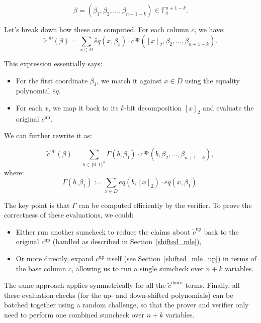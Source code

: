 \documentclass{article}
\newcommand{\Fq}{\mathbb F_q}
\begin{document}
$$
\beta = (\beta_1, \beta_2, \dots, \beta_{n + 1 - k}) \in \Fq^{n + 1 - k}.
$$ 

Let’s break down how these are computed. For each column $c$, we have:
$$
\widetilde{c}^{\text{up}}(\beta) = \sum_{x \in D} \widetilde{eq}(x, \beta_1) \cdot c^{\text{up}}([x]_2, \beta_2, \dots, \beta_{n + 1 - k}).
$$

This expression essentially says:
\begin{itemize}
    \item For the first coordinate $\beta_1$, we match it against $x \in D$ using the equality polynomial $\widetilde{eq}$.
    \item For each $x$, we map it back to its $k$-bit decomposition $[x]_2$ and evaluate the original $c^{\text{up}}$.
\end{itemize}

We can further rewrite it as:

$$
\widetilde{c}^{\text{up}}(\beta) = \sum_{b \in \{0,1\}^k} \Gamma(b, \beta_1) \cdot c^{\text{up}}(b, \beta_2, \dots, \beta_{n + 1 - k}),
$$
where:
$$
\Gamma(b, \beta_1) := \sum_{x \in D} eq(b, [x]_2) \cdot \widetilde{eq}(x, \beta_1).
$$

The key point is that $\Gamma$ can be computed efficiently by the verifier. To prove the correctness of these evaluations, we could:
\begin{itemize}
    \item Either run another sumcheck to reduce the claims about $\widetilde{c}^{\text{up}}$ back to the original $c^{\text{up}}$ (handled as described in Section~\ref{shifted_mle}),
    \item Or more directly, expand $c^{\text{up}}$ itself (see Section~\ref{shifted_mle_up}) in terms of the base column $c$, allowing us to run a single sumcheck over $n + k$ variables.
\end{itemize}

The same approach applies symmetrically for all the $\widetilde{c}^{\text{down}}$ terms. Finally, all these evaluation checks (for the up- and down-shifted polynomials) can be batched together using a random challenge, so that the prover and verifier only need to perform one combined sumcheck over $n + k$ variables.




\end{document}
